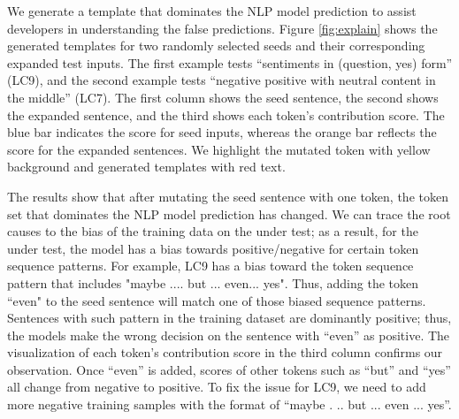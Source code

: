  We generate a template that dominates the NLP model prediction to assist developers in understanding the false predictions. Figure \ref{fig:explain} shows the generated templates for two randomly selected seeds and their corresponding expanded test inputs.
The first example tests ``sentiments in (question, yes) form'' (LC9), and the second example tests ``negative positive with neutral content in the middle''  (LC7).
The first column shows the seed sentence, the second shows the expanded sentence, and the third shows each token's contribution score. The blue bar indicates the score for seed inputs, whereas the orange bar reflects the score for the expanded sentences.
We highlight the mutated token with yellow background and generated templates with red text. 

The results show that after mutating the seed sentence with one token, the token set that dominates the NLP model prediction has changed.
We can trace the root causes to the bias of the training data on the \lc under test; as a result, for the \lc under test, the model has a bias towards positive/negative for certain token sequence patterns. For example, LC9 has a bias toward the token sequence pattern that includes "maybe .... but ... even... yes". Thus, adding the token ``even" to the seed sentence will match one of those biased sequence patterns.
Sentences with such pattern in the training dataset are dominantly positive; thus, the models make the wrong decision on the sentence with ``even'' as positive. 
The visualization of each token's contribution score in the third column confirms our observation. Once ``even'' is added, scores of other tokens such as ``but'' and ``yes'' all change from negative to positive.
To fix the issue for LC9, we need to add more negative training samples with the format of ``maybe . .. but ... even ... yes''.
